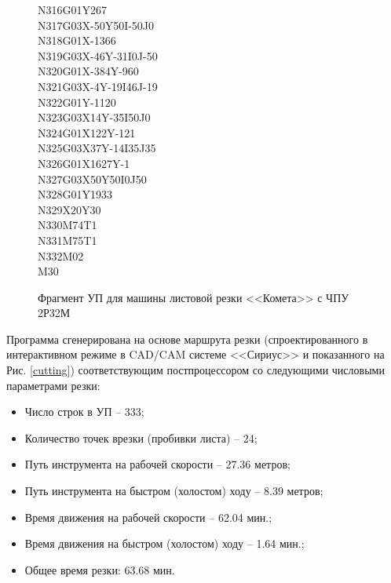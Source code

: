 \documentclass[11pt,twoside]{report}
\begin{document}
\begin{figure}
\begin{multicols}{3}
  N316G01Y267 \\
  N317G03X-50Y50I-50J0  \\
  N318G01X-1366 \\
  N319G03X-46Y-31I0J-50 \\
  N320G01X-384Y-960 \\
  N321G03X-4Y-19I46J-19 \\
  N322G01Y-1120 \\
  N323G03X14Y-35I50J0 \\
  N324G01X122Y-121  \\
  N325G03X37Y-14I35J35  \\
  N326G01X1627Y-1 \\
  N327G03X50Y50I0J50  \\
  N328G01Y1933  \\
  N329X20Y30  \\
  N330M74T1 \\
  N331M75T1 \\
  N332M02 \\
  M30
\end{multicols}
\caption{Фрагмент УП для машины листовой резки <<Комета>> с ЧПУ 2Р32М }
\label{control-program}
\end{figure}

Программа сгенерирована на основе маршрута резки
(спроектированного в интерактивном режиме в CAD/CAM системе <<Сириус>>
и показанного на Рис. \ref{cutting})
соответствующим постпроцессором со
следующими числовыми параметрами резки:
\begin{itemize}
  \item	Число строк в УП – 333;
  \item	Количество точек врезки (пробивки листа) – 24;
  \item	Путь инструмента на рабочей скорости – 27.36 метров;
  \item	Путь инструмента на быстром (холостом) ходу – 8.39 метров;
  \item	Время движения на рабочей скорости – 62.04 мин.;
  \item	Время движения на быстром (холостом) ходу – 1.64 мин.;
  \item	Общее время резки: 63.68 мин.
\end{itemize}
\end{document}
